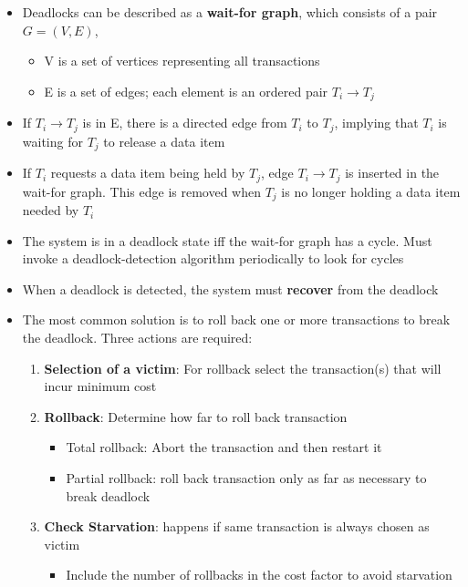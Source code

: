 \begin{itemize}[label=\(\rhd\)]
    \item Deadlocks can be described as a \textbf{wait-for graph}, which consists of a pair $G=(V,E)$,
    \begin{itemize}[label=\(\rhd\)]
        \item V is a set of vertices representing all transactions
        \item E is a set of edges; each element is an ordered pair $T_i\rightarrow T_j$
    \end{itemize}
    \item If $T_i \rightarrow T_j$ is in E, there is a directed edge from $T_i$ to $T_j$, implying that $T_i$ is waiting for $T_j$ to release a data item
    \item If $T_i$ requests a data item being held by $T_j$, edge $T_i \rightarrow T_j$ is inserted in the wait-for graph. This edge is removed when $T_j$ is no longer holding a data item needed by $T_i$
    \item The system is in a deadlock state iff the wait-for graph has a cycle. Must invoke a deadlock-detection algorithm periodically to look for cycles
    \item When a deadlock is detected, the system must \textbf{recover} from the deadlock
    \item The most common solution is to roll back one or more transactions to break the deadlock. Three actions are required: 
    \begin{enumerate}
        \item \textbf{Selection of a victim}: For rollback select the transaction(s) that will incur minimum cost
        \item \textbf{Rollback}: Determine how far to roll back transaction
        \begin{itemize}[label=\(\rhd\)]
            \item Total rollback: Abort the transaction and then restart it
            \item Partial rollback: roll back transaction only as far as necessary to break deadlock
        \end{itemize}
        \item \textbf{Check Starvation}: happens if same transaction is always chosen as victim
        \begin{itemize}[label=\(\rhd\)]
            \item Include the number of rollbacks in the cost factor to avoid starvation
        \end{itemize}
    \end{enumerate}
\end{itemize}

